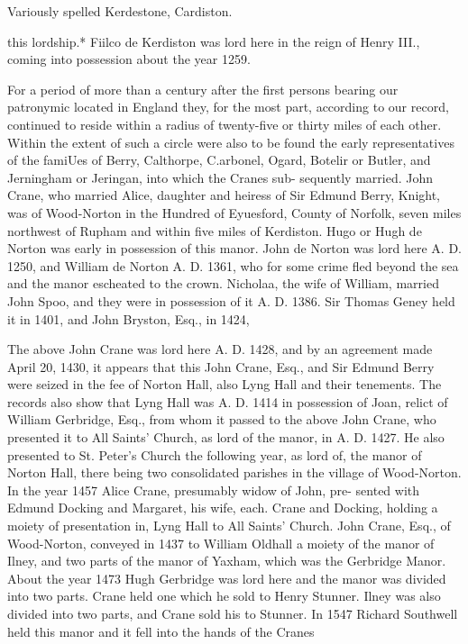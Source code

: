 \documentclass{book}
\begin{document}
Variously spelled Kerdestone, Cardiston. 




this lordship.* Fiilco de Kerdiston was lord here in the reign of 
Henry III., coming into possession about the year 1259. 

For a period of more than a century after the first persons 
bearing our patronymic located in England they, for the most 
part, according to our record, continued to reside within a radius 
of twenty-five or thirty miles of each other. Within the extent 
of such a circle were also to be found the early representatives of 
the famiUes of Berry, Calthorpe, C.arbonel, Ogard, Botelir or 
Butler, and Jerningham or Jeringan, into which the Cranes sub- 
sequently married. John Crane, who married Alice, daughter 
and heiress of Sir Edmund Berry, Knight, was of Wood-Norton 
in the Hundred of Eyuesford, County of Norfolk, seven miles 
northwest of Rupham and within five miles of Kerdiston. Hugo 
or Hugh de Norton was early in possession of this manor. John 
de Norton was lord here A. D. 1250, and William de Norton A. 
D. 1361, who for some crime fled beyond the sea and the manor 
escheated to the crown. Nicholaa, the wife of William, married 
John Spoo, and they were in possession of it A. D. 1386. Sir 
Thomas Geney held it in 1401, and John Bryston, Esq., in 1424, 

The above John Crane was lord here A. D. 1428, and by an 
agreement made April 20, 1430, it appears that this John Crane, 
Esq., and Sir Edmund Berry were seized in the fee of Norton 
Hall, also Lyng Hall and their tenements. The records also 
show that Lyng Hall was A. D. 1414 in possession of Joan, relict 
of William Gerbridge, Esq., from whom it passed to the above 
John Crane, who presented it to All Saints' Church, as lord of the 
manor, in A. D. 1427. He also presented to St. Peter's Church 
the following year, as lord of, the manor of Norton Hall, there 
being two consolidated parishes in the village of Wood-Norton. 
In the year 1457 Alice Crane, presumably widow of John, pre- 
sented with Edmund Docking and Margaret, his wife, each. 
Crane and Docking, holding a moiety of presentation in, Lyng 
Hall to All Saints' Church. John Crane, Esq., of Wood-Norton, 
conveyed in 1437 to William Oldhall a moiety of the manor of 
Ilney, and two parts of the manor of Yaxham, which was the 
Gerbridge Manor. About the year 1473 Hugh Gerbridge was 
lord here and the manor was divided into two parts. Crane held 
one which he sold to Henry Stunner. Ilney was also divided 
into two parts, and Crane sold his to Stunner. In 1547 Richard 
Southwell held this manor and it fell into the hands of the Cranes 
\end{document}
